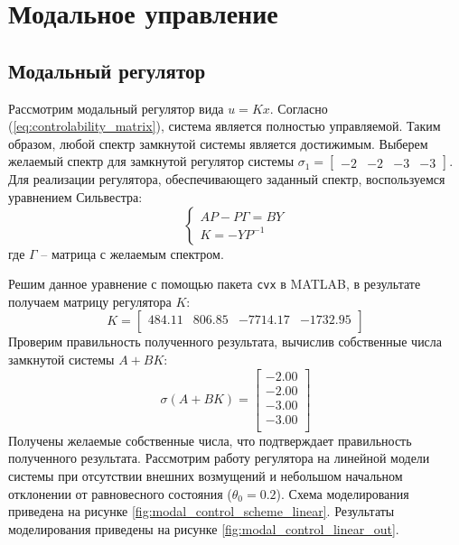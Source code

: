 \section{Модальное управление}
\subsection{Модальный регулятор}
Рассмотрим модальный регулятор вида $u = Kx$. Согласно (\ref{eq:controlability_matrix}), система является 
полностью управляемой. Таким образом, любой спектр замкнутой системы является достижимым. 
Выберем желаемый спектр для замкнутой регулятор системы $\sigma_1 = \begin{bmatrix}-2 & -2 & -3 & -3\end{bmatrix}$. 
Для реализации регулятора, обеспечивающего заданный спектр, воспользуемся уравнением Сильвестра: 
\begin{equation}
    \begin{cases}
        AP - P\Gamma = BY \\
        K = -YP^{-1} 
    \end{cases}
\end{equation}
где $\Gamma$ -- матрица с желаемым спектром. 

Решим данное уравнение с помощью пакета \texttt{cvx} в MATLAB, в результате получаем матрицу регулятора $K$:
\begin{equation}
    K = \begin{bmatrix}
    484.11  & 806.85  & -7714.17  & -1732.95 \\ 
    \end{bmatrix}
\end{equation} 
Проверим правильность полученного результата, вычислив собственные числа замкнутой системы $A + BK$: 
\begin{equation}
    \sigma(A + BK) = \begin{bmatrix}
    -2.00 \\ 
    -2.00 \\ 
    -3.00 \\ 
    -3.00 \\ 
    \end{bmatrix}
\end{equation}
Получены желаемые собственные числа, что подтверждает правильность полученного результата. 
Рассмотрим работу регулятора на линейной модели системы при отсутствии внешних возмущений и 
небольшом начальном отклонении от равновесного состояния ($\theta_0 = 0.2$). Схема моделирования приведена на 
рисунке \ref{fig:modal_control_scheme_linear}. Результаты моделирования приведены на 
рисунке \ref{fig:modal_control_linear_out}.

